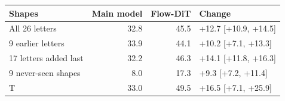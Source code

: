 \begin{tabular}{@{}lrrl@{}}
\toprule
Shapes & Main model & Flow-DiT & Change \\
\midrule
All 26 letters & 32.8 & 45.5 & +12.7 [+10.9, +14.5] \\
9 earlier letters & 33.9 & 44.1 & +10.2 [+7.1, +13.3] \\
17 letters added last & 32.2 & 46.3 & +14.1 [+11.8, +16.3] \\
9 never-seen shapes & 8.0 & 17.3 & +9.3 [+7.2, +11.4] \\
T & 33.0 & 49.5 & +16.5 [+7.1, +25.9] \\
\bottomrule
\end{tabular}

